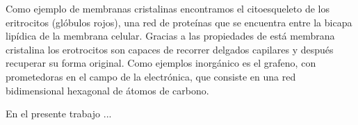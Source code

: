 Como ejemplo de membranas cristalinas encontramos el citoesqueleto de los
eritrocitos (glóbulos rojos), una red de proteínas que se encuentra entre
la bicapa lipídica de la membrana celular. Gracias a las propiedades de está
membrana cristalina los erotrocitos son capaces de recorrer delgados capilares
y después recuperar su forma original. Como ejemplos inorgánico es el grafeno,
con prometedoras en el campo de la electrónica, que consiste en una red
bidimensional hexagonal de átomos de carbono.

En el presente trabajo ...



  
